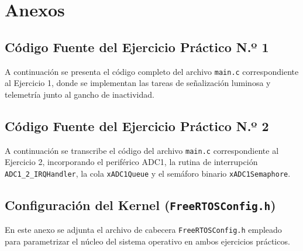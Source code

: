 \chapter{Anexos}
\label{sec.anexos:codigo}

\section{Código Fuente del Ejercicio Práctico N.º 1}

A continuación se presenta el código completo del archivo \texttt{main.c} correspondiente al Ejercicio 1,
donde se implementan las tareas de señalización luminosa y telemetría junto al gancho de inactividad.



\newpage

\section{Código Fuente del Ejercicio Práctico N.º 2}

A continuación se transcribe el código del archivo \texttt{main.c} correspondiente al Ejercicio 2,
incorporando el periférico ADC1, la rutina de interrupción \texttt{ADC1\_2\_IRQHandler}, la cola \texttt{xADC1Queue}
y el semáforo binario \texttt{xADC1Semaphore}.



\newpage

\section{Configuración del Kernel (\texttt{FreeRTOSConfig.h})}

En este anexo se adjunta el archivo de cabecera \texttt{FreeRTOSConfig.h} empleado para parametrizar el núcleo del
sistema operativo en ambos ejercicios prácticos.


